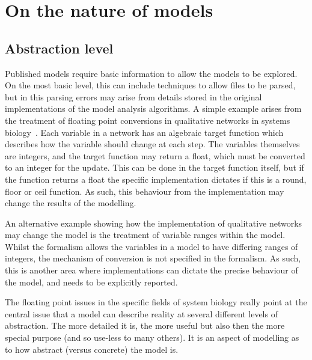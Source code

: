 \documentclass[conference]{IEEEtran}
\begin{document}

\section{On the nature of models}


\subsection{Abstraction level} 

Published models require basic information to allow the models to be
explored. On the most basic level, this can include techniques to allow
files to be parsed, but in this parsing errors may arise from details 
stored in the original implementations of the model analysis algorithms.
A simple example arises from the treatment of floating point conversions
in qualitative networks in systems biology~\cite{Schaub2007}. Each
variable in a network has an algebraic target function which describes
how the variable should change at each step. The variables themselves are
integers, and the target function may return a float, which must be converted
to an integer for the update. This can be done in the target function 
itself, but if the function returns a float the specific implementation
dictates if this is a round, floor or ceil function. As such, this behaviour
from the implementation may change the results of the modelling.

An alternative example showing how the implementation of qualitative networks
may change the model is the treatment of variable ranges within the model.
Whilst the formalism allows the variables in a model to have differing 
ranges of integers, the mechanism of conversion is not specified in the 
formalism. As such, this is another area where implementations can dictate
the precise behaviour of the model, and needs to be explicitly reported.

The floating point issues in the specific fields of system biology
really point at the central issue that a model can describe reality at
several different levels of abstraction. The more detailed it is, the
more useful but also then the more special purpose (and so use-less to
many others). It is an aspect of modelling as to how abstract (versus
concrete) the model is.


\end{document}
